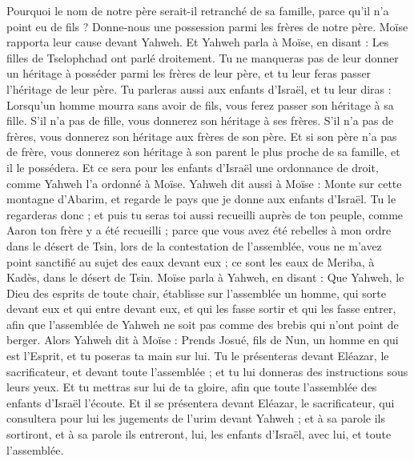 \begin{multicols}{2}
Pourquoi le nom de notre père serait-il retranché de sa famille, parce qu'il n'a point eu de fils ? Donne-nous une possession parmi les frères de notre père.
Moïse rapporta leur cause devant Yahweh.
Et Yahweh parla à Moïse, en disant :
Les filles de Tselophchad ont parlé droitement. Tu ne manqueras pas de leur donner un héritage à posséder parmi les frères de leur père, et tu leur feras passer l’héritage de leur père.
Tu parleras aussi aux enfants d'Israël, et tu leur diras : Lorsqu'un homme mourra sans avoir de fils, vous ferez passer son héritage à sa fille.
S'il n'a pas de fille, vous donnerez son héritage à ses frères.
S'il n'a pas de frères, vous donnerez son héritage aux frères de son père.
Et si son père n'a pas de frère, vous donnerez son héritage à son parent le plus proche de sa famille, et il le possédera. Et ce sera pour les enfants d'Israël une ordonnance de droit, comme Yahweh l'a ordonné à Moïse.
Yahweh dit aussi à Moïse : Monte sur cette montagne d'Abarim, et regarde le pays que je donne aux enfants d'Israël.
Tu le regarderas donc ; et puis tu seras toi aussi recueilli auprès de ton peuple, comme Aaron ton frère y a été recueilli ;
parce que vous avez été rebelles à mon ordre dans le désert de Tsin, lors de la contestation de l'assemblée, vous ne m'avez point sanctifié au sujet des eaux devant eux ; ce sont les eaux de Meriba, à Kadès, dans le désert de Tsin.
Moïse parla à Yahweh, en disant :
Que Yahweh, le Dieu des esprits de toute chair, établisse sur l'assemblée un homme,
qui sorte devant eux et qui entre devant eux, et qui les fasse sortir et qui les fasse entrer, afin que l'assemblée de Yahweh ne soit pas comme des brebis qui n'ont point de berger.
Alors Yahweh dit à Moïse : Prends Josué, fils de Nun, un homme en qui est l'Esprit, et tu poseras ta main sur lui.
Tu le présenteras devant Eléazar, le sacrificateur, et devant toute l'assemblée ; et tu lui donneras des instructions sous leurs yeux.
Et tu mettras sur lui de ta gloire, afin que toute l'assemblée des enfants d'Israël l'écoute.
Et il se présentera devant Eléazar, le sacrificateur, qui consultera pour lui les jugements de l'urim devant Yahweh ; et à sa parole ils sortiront, et à sa parole ils entreront, lui, les enfants d’Israël, avec lui, et toute l’assemblée.

\end{multicols}

